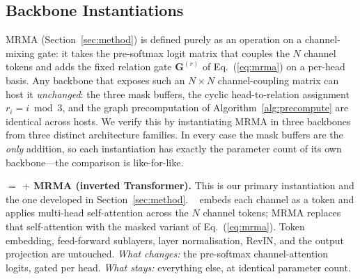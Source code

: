 
\subsection{Backbone Instantiations}
\label{sec:instantiations}

MRMA (Section~\ref{sec:method}) is defined purely as an operation on a
channel-mixing gate: it takes the pre-softmax logit matrix that couples the $N$
channel tokens and adds the fixed relation gate $\mathbf{G}^{(r)}$ of
Eq.~(\ref{eq:mrma}) on a per-head basis.
Any backbone that exposes such an $N{\times}N$ channel-coupling matrix can host
it \emph{unchanged}: the three mask buffers, the cyclic head-to-relation
assignment $r_i{=}i\bmod 3$, and the graph precomputation of
Algorithm~\ref{alg:precompute} are identical across hosts.
We verify this by instantiating MRMA in three backbones from three distinct
architecture families.
In every case the mask buffers are the \emph{only} addition, so each
instantiation has exactly the parameter count of its own backbone---the
comparison is like-for-like.

\textbf{\mr{} ${=}$ \itrans{} ${+}$ MRMA (inverted Transformer).}
This is our primary instantiation and the one developed in
Section~\ref{sec:method}.
\itrans{}~\cite{liu2023itransformer} embeds each channel as a token and applies
multi-head self-attention across the $N$ channel tokens; MRMA replaces that
self-attention with the masked variant of Eq.~(\ref{eq:mrma}).
Token embedding, feed-forward sublayers, layer normalisation, RevIN, and the
output projection are untouched.
\emph{What changes:} the pre-softmax channel-attention logits, gated per head.
\emph{What stays:} everything else, at identical parameter count.

